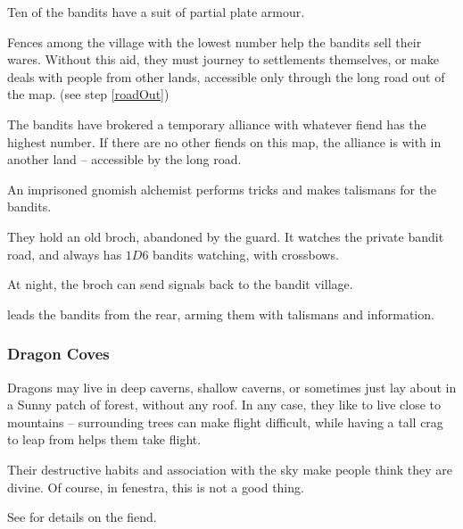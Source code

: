 \begin{multicols}{2}
\begin{dlist}
  \item
  Ten of the bandits have a suit of partial plate armour.
  \item
  Fences among the \gls{village} with the lowest number help the bandits sell their wares.
  Without this aid, they must journey to settlements themselves, or make deals with people from other lands, accessible only through the long road out of the map.
  (see step \vref{roadOut})
  \item
  The bandits have brokered a temporary alliance with whatever \gls{fiend} has the highest number.
  If there are no other \glspl{fiend} on this map, the alliance is with  in another land -- accessible by the long road.
  \item
  An imprisoned gnomish alchemist performs tricks and makes \glspl{talisman} for the bandits.
  \item
  They hold an old \gls{broch}, abandoned by the \gls{guard}.
  It watches the private bandit road, and always has $1D6$ bandits watching, with crossbows.

  At night, the \gls{broch} can send signals back to the bandit \gls{village}.
  \item
   leads the bandits from the rear, arming them with \glspl{talisman} and information.
\end{dlist}

\subsubsection{Dragon Coves}
\label{dragonPoint}

Dragons may live in deep caverns, shallow caverns, or sometimes just lay about in a Sunny patch of forest, without any roof.
In any case, they like to live close to mountains -- surrounding trees can make flight difficult, while having a tall crag to leap from helps them take flight.

Their destructive habits and association with the sky make people think they are divine.
Of course, in \gls{fenestra}, this is not a good thing.

See  for details on the fiend.


\end{multicols}
